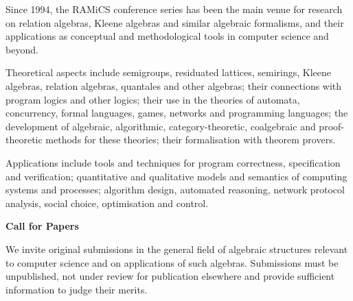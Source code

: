 \documentclass[a3paper, 12pt]{article}
\newcommand*\nfont{\fontsize{16}{19}\selectfont}
\begin{document}
\begin{minipage}[t]{.473\linewidth}
  \nfont%
  Since 1994, the RAMiCS conference series has been the main venue for
  research on relation algebras, Kleene algebras and similar algebraic
  formalisms, and their applications as conceptual and methodological
  tools in computer science and beyond.

  \medskip

  Theoretical aspects include semigroups, residuated lattices,
  semirings, Kleene algebras, relation algebras, quantales and other
  algebras; their connections with program logics and other logics;
  their use in the theories of automata, concurrency, formal
  languages, games, networks and programming languages; the
  development of algebraic, algorithmic, category-theoretic,
  coalgebraic and proof-theoretic methods for these theories; their
  formalisation with theorem provers.

  \medskip

  Applications include tools and techniques for program correctness,
  specification and verification; quantitative and qualitative models
  and semantics of computing systems and processes; algorithm design,
  automated reasoning, network protocol analysis, social choice,
  optimisation and control.

  \bigskip

  {\Large \bf Call for Papers}

  \smallskip

  We invite original submissions in the general field of algebraic
  structures relevant to computer science and on applications of such
  algebras.  Submissions must be unpublished, not under review for
  publication elsewhere and provide sufficient information to judge
  their merits.
\end{minipage}
\hfill
\end{document}
